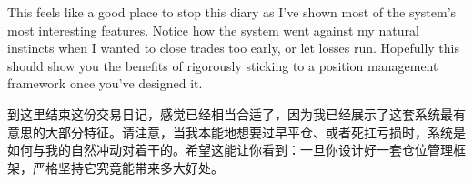 \bipairgap

\begin{englishblock} This feels like a good place to stop this diary as I've shown most of the system's most interesting features. Notice how the system went against my natural instincts when I wanted to close trades too early, or let losses run. Hopefully this should show you the benefits of rigorously sticking to a position management framework once you've designed it. \end{englishblock}

\begin{chineseblock}到这里结束这份交易日记，感觉已经相当合适了，因为我已经展示了这套系统最有意思的大部分特征。请注意，当我本能地想要过早平仓、或者死扛亏损时，系统是如何与我的自然冲动对着干的。希望这能让你看到：一旦你设计好一套仓位管理框架，严格坚持它究竟能带来多大好处。\end{chineseblock}
